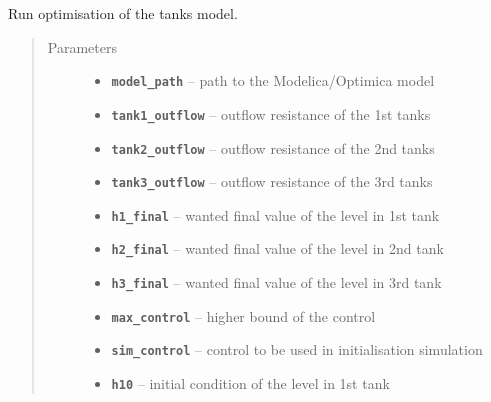 \documentclass[letterpaper,10pt,english]{sphinxmanual}
\begin{document}

\begin{fulllineitems}
\label{ds_tanks.tanks_utils:ds_tanks.tanks_utils.run_optimisation}
Run optimisation of the tanks model.
\begin{quote}\begin{description}
\item[{Parameters}] \leavevmode\begin{itemize}
\item {} 
\textbf{\texttt{model\_path}} -- path to the Modelica/Optimica model

\item {} 
\textbf{\texttt{tank1\_outflow}} -- outflow resistance of the 1st tanks

\item {} 
\textbf{\texttt{tank2\_outflow}} -- outflow resistance of the 2nd tanks

\item {} 
\textbf{\texttt{tank3\_outflow}} -- outflow resistance of the 3rd tanks

\item {} 
\textbf{\texttt{h1\_final}} -- wanted final value of the level in 1st tank

\item {} 
\textbf{\texttt{h2\_final}} -- wanted final value of the level in 2nd tank

\item {} 
\textbf{\texttt{h3\_final}} -- wanted final value of the level in 3rd tank

\item {} 
\textbf{\texttt{max\_control}} -- higher bound of the control

\item {} 
\textbf{\texttt{sim\_control}} -- control to be used in initialisation simulation

\item {} 
\textbf{\texttt{h10}} -- initial condition of the level in 1st tank


\end{itemize}
\end{description}
\end{quote}
\end{fulllineitems}
\end{document}
